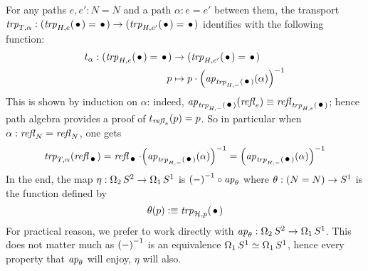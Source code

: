 \documentclass[english,a4]{article}
\begin{document}
For any paths $e,e':N=N$ and a path $\alpha: e=e'$ between them, the
transport
$\trp{T,\alpha}:(\trp{H,e}(\base) = \base) \to (\trp{H,e'}(\base) =
\base)$ identifies with the following function:
\begin{equation}
  \begin{aligned}
    {t_\alpha}: (\trp{H,e}(\base) = \base) &\to (\trp{H,e'}(\base) = \base)
    \\
    p &\mapsto p\cdot \inv{\left(\ap{\trp{H,-}(\base)}(\alpha)\right)}
  \end{aligned}
\end{equation}
This is shown by induction on $\alpha$: indeed,
$\ap{\trp{H,-}(\base)}(\refl{e}) \jdeq \refl{\trp{H,e}(\base)}$; hence
path algebra provides a proof of $t_{\mathop{{\mathit{refl}}_{e}}}(p) = p$. So in
particular when $\alpha:\mathop{{\mathit{refl}}_{N}} = \mathop{{\mathit{refl}}_{N}}$, one gets
\begin{equation}\label{eq:trp-Ta(refl)}
  \trp{T,\alpha}(\refl \base) = \refl \base \cdot \inv{\left(\ap{\trp{H,-}(\base)}(\alpha)\right)}
  = \inv{\left(\ap{\trp{H,-}(\base)}(\alpha)\right)}
\end{equation}
In the end, the map $\eta: \operatorname{\Omega_{2}} S^2 \to \operatorname{\Omega_{1}} {S^1}$
is ${(\mathord{-})}^{-1} \circ \mathop{{\it ap}_{\theta}}$ where $\theta : (N=N) \to {S^1}$ is the function defined by
\begin{equation}
  \label{eq:17}
  \theta(p) \defequi \trp{\hopffam,p}(\base)
\end{equation}
For practical reason, we prefer to work directly with
$\mathop{{\it ap}_{\theta}}: \operatorname{\Omega_{2}} S^2 \to \operatorname{\Omega_{1}} {S^1}$. This does not
matter much as ${(\mathord{-})}^{-1}$ is an equivalence
$\operatorname{\Omega_{1}} {S^1} \simeq \operatorname{\Omega_{1}} {S^1}$, hence every property that
$\mathop{{\it ap}_{\theta}}$ will enjoy, $\eta$ will also.
\end{document}
